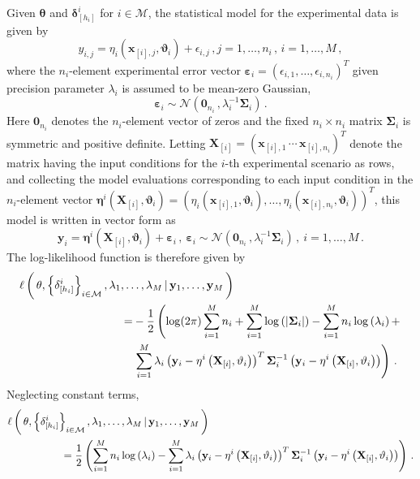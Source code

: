 \documentclass[11pt, oneside]{article}   	%
\begin{document}
\noindent
Given $\mathbf{\theta}$ and $\mathbf{\delta}_{[h_i]}^i$ for $i \in \mathcal{M}$, the statistical model for the experimental data is given by
\[
y_{i,j} = \eta_i \left(\mathbf{x}_{[i],j}, \mathbf{\vartheta}_i \right) + \epsilon_{i,j} \,, j = 1, \ldots, n_i \,,\, i = 1, \ldots, M \,,
\]
where the $n_i$-element experimental error vector $\mathbf{\varepsilon}_i = (\epsilon_{i,1}, \ldots, \epsilon_{i,n_i})^T$ given precision parameter $\lambda_i$ is assumed to be mean-zero Gaussian,
\[
\mathbf{\varepsilon}_i \sim \mathcal{N} \left( \mathbf{0}_{n_i} \,, \lambda_i^{-1} \mathbf{\Sigma}_i \right) \,.
\]
Here $\mathbf{0}_{n_i}$ denotes the $n_i$-element vector of zeros and the fixed $n_i \times n_i$ matrix $\mathbf{\Sigma}_i$ is symmetric and positive definite.  Letting $\mathbf{X}_{[i]} = \left( \mathbf{x}_{[i],1} \, \cdots \, \mathbf{x}_{[i],n_i} \right)^T$ denote the matrix having the input conditions for the $i$-th experimental scenario as rows, and collecting the model evaluations corresponding to each input condition in the $n_i$-element vector $\mathbf{\eta}^i \left( \mathbf{X}_{[i]}, \mathbf{\vartheta}_i \right) = \left(\eta_i \left( \mathbf{x}_{[i],1}, \mathbf{\vartheta}_i \right), \ldots, \eta_i \left( \mathbf{x}_{[i], n_i}, \mathbf{\vartheta}_i \right) \right)^T$, this model is written in vector form as
\[
\mathbf{y}_i = \mathbf{\eta}^i \left( \mathbf{X}_{[i]}, \mathbf{\vartheta}_i \right) + \mathbf{\varepsilon}_i \,,~\mathbf{\varepsilon}_i \sim \mathcal{N} \left( \mathbf{0}_{n_i} \,, \lambda_i^{-1} \mathbf{\Sigma}_i \right) \,,~ i = 1, \ldots, M \,.
\]
The log-likelihood function is therefore given by
\begin{align*}
\MoveEqLeft[10] \ell \left( \, \mathbf{\theta}, \left\{ \mathbf{\delta}_{[h_i]}^i \right\}_{i \in \mathcal{M}}, \lambda_1, \ldots, \lambda_M \, | \, \mathbf{y}_1, \ldots, \mathbf{y}_M \, \right) \\
=& -\frac{1}{2} \left( \log(2 \pi) \sum_{i=1}^M n_i + \sum_{i=1}^M \log \left( \left| \mathbf{\Sigma}_i \right| \right) - \sum_{i=1}^M n_i \log \left( \lambda_i \right) +  \right. \\
&\left. \sum_{i=1}^M \lambda_i \left( \mathbf{y}_i - \mathbf{\eta}^i \left( \mathbf{X}_{[i]}, \mathbf{\vartheta}_i \right) \right)^T \mathbf{\Sigma}_i^{-1} \left( \mathbf{y}_i - \mathbf{\eta}^i \left( \mathbf{X}_{[i]}, \mathbf{\vartheta}_i \right) \right) \right) \,.
\end{align*}
Neglecting constant terms,
\begin{align*}
\MoveEqLeft[5] \ell \left( \, \mathbf{\theta}, \left\{ \mathbf{\delta}_{[h_i]}^i \right\}_{i \in \mathcal{M}}, \lambda_1, \ldots, \lambda_M \, | \, \mathbf{y}_1, \ldots, \mathbf{y}_M \, \right) \\
& = \frac{1}{2} \left( \sum_{i=1}^M n_i \log \left( \lambda_i \right) - \sum_{i=1}^M \lambda_i \left( \mathbf{y}_i - \mathbf{\eta}^i \left( \mathbf{X}_{[i]}, \mathbf{\vartheta}_i \right) \right)^T \mathbf{\Sigma}_i^{-1} \left( \mathbf{y}_i - \mathbf{\eta}^i \left( \mathbf{X}_{[i]}, \mathbf{\vartheta}_i \right) \right) \right) \,.
\end{align*}
\end{document}
